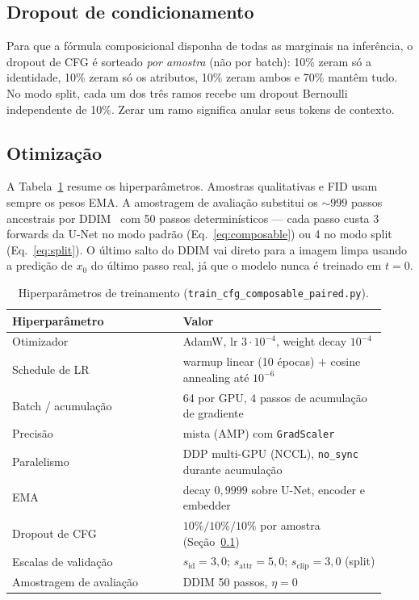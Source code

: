 \documentclass[10pt,twocolumn]{article}
\begin{document}
\subsection{Dropout de condicionamento}
\label{sec:dropout}

Para que a fórmula composicional disponha de todas as marginais na
inferência, o dropout de CFG é sorteado \emph{por amostra} (não por
batch): 10\% zeram só a identidade, 10\% zeram só os atributos, 10\%
zeram ambos e 70\% mantêm tudo. No modo split, cada um dos três ramos
recebe um dropout Bernoulli independente de 10\%. Zerar um ramo significa
anular seus tokens de contexto.

\subsection{Otimização}

A Tabela~\ref{tab:hiperparametros} resume os hiperparâmetros. Amostras
qualitativas e FID usam sempre os pesos EMA. A amostragem de avaliação
substitui os ${\sim}999$ passos ancestrais por DDIM~\cite{song2021} com
50 passos determinísticos --- cada passo custa 3 forwards da U-Net no
modo padrão (Eq.~\ref{eq:composable}) ou 4 no modo split
(Eq.~\ref{eq:split}). O último salto do DDIM vai direto para a imagem
limpa usando a predição de $x_0$ do último passo real, já que o modelo
nunca é treinado em $t = 0$.

\begin{table}[t]
  \centering
  \caption{Hiperparâmetros de treinamento
  (\texttt{train\_cfg\_composable\_paired.py}).}
  \label{tab:hiperparametros}
  \small
  \begin{tabular}{@{}p{0.42\linewidth}p{0.5\linewidth}@{}}
    \toprule
    \textbf{Hiperparâmetro} & \textbf{Valor} \\
    \midrule
    Otimizador          & AdamW, lr $3{\cdot}10^{-4}$, weight decay $10^{-4}$ \\
    Schedule de LR      & warmup linear (10 épocas) $+$ cosine annealing até $10^{-6}$ \\
    Batch / acumulação  & 64 por GPU, 4 passos de acumulação de gradiente \\
    Precisão            & mista (AMP) com \texttt{GradScaler} \\
    Paralelismo         & DDP multi-GPU (NCCL), \texttt{no\_sync} durante acumulação \\
    EMA                 & decay $0{,}9999$ sobre U-Net, encoder e embedder \\
    Dropout de CFG      & $10\%/10\%/10\%$ por amostra (Seção~\ref{sec:dropout}) \\
    Escalas de validação & $s_{\mathrm{id}}{=}3{,}0$; $s_{\mathrm{attr}}{=}5{,}0$; $s_{\mathrm{clip}}{=}3{,}0$ (split) \\
    Amostragem de avaliação & DDIM 50 passos, $\eta = 0$ \\
    \bottomrule
  \end{tabular}
\end{table}
\end{document}
